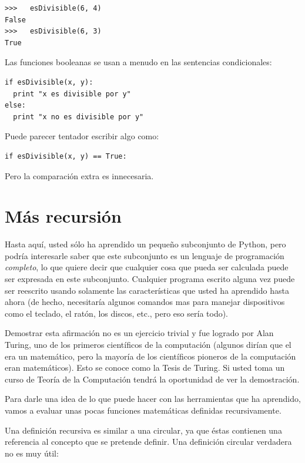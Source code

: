 \beforeverb
\begin{verbatim}
>>>   esDivisible(6, 4)
False
>>>   esDivisible(6, 3)
True
\end{verbatim}
\afterverb
%
Las funciones booleanas se usan a menudo en las sentencias condicionales:

\beforeverb
\begin{verbatim}
if esDivisible(x, y):
  print "x es divisible por y"
else:
  print "x no es divisible por y"
\end{verbatim}
\afterverb
%

Puede parecer tentador escribir algo como:

\beforeverb
\begin{verbatim}
if esDivisible(x, y) == True:
\end{verbatim}
\afterverb
%
Pero la comparación extra es innecesaria.



\section{Más recursión}

Hasta aquí, usted sólo ha aprendido un pequeño subconjunto de Python,
pero podría interesarle saber que este subconjunto es un lenguaje
de programación {\em completo}, lo que quiere decir que cualquier 
cosa que pueda ser calculada puede ser expresada en este subconjunto.
Cualquier programa escrito alguna vez puede ser reescrito usando solamente
las características que usted ha aprendido hasta ahora (de hecho, 
necesitaría algunos comandos mas para manejar dispositivos como
el teclado, el ratón, los discos, etc., pero eso sería todo).

Demostrar esta afirmación no es un ejercicio trivial y fue logrado por 
Alan Turing, uno de los primeros científicos de la computación (algunos
dirían que el era un matemático, pero la mayoría de los científicos
pioneros de la computación  eran matemáticos). Esto se conoce como la Tesis
de Turing. Si usted toma un curso de Teoría de la Computación tendrá
la oportunidad de ver la demostración.


Para darle una idea de lo que puede hacer con las herramientas que ha
aprendido, vamos a evaluar unas pocas funciones matemáticas definidas
recursivamente. 

Una definición recursiva es similar a una circular, ya que éstas 
contienen una referencia al concepto que se pretende definir. 
Una definición circular verdadera no es muy útil:

